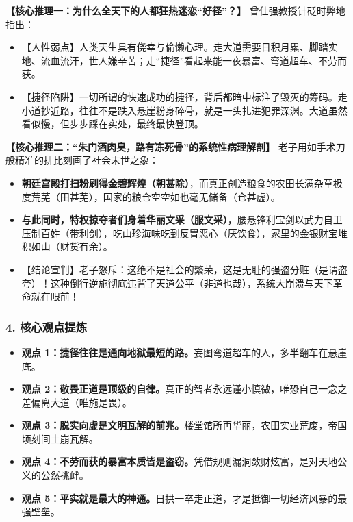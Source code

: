 \noindent\textbf{【核心推理一：为什么全天下的人都狂热迷恋“好径”？】}
曾仕强教授针砭时弊地指出：
\begin{itemize}
    \item 【人性弱点】人类天生具有侥幸与偷懒心理。走大道需要日积月累、脚踏实地、流血流汗，世人嫌辛苦；走“捷径”看起来能一夜暴富、弯道超车、不劳而获。
    \item 【捷径陷阱】一切所谓的快速成功的捷径，背后都暗中标注了毁灭的筹码。走小道抄近路，往往不是跌入悬崖粉身碎骨，就是一头扎进犯罪深渊。大道虽然看似慢，但步步踩在实处，最终最快登顶。
\end{itemize}

\noindent\textbf{【核心推理二：“朱门酒肉臭，路有冻死骨”的系统性病理解剖】}
老子用如手术刀般精准的排比刻画了社会末世之象：
\begin{itemize}
    \item \textbf{朝廷宫殿打扫粉刷得金碧辉煌（朝甚除）}，而真正创造粮食的农田长满杂草极度荒芜（田甚芜），国家的粮仓空空如也毫无储备（仓甚虚）。
    \item \textbf{与此同时，特权掠夺者们身着华丽文采（服文采）}，腰悬锋利宝剑以武力自卫压制百姓（带利剑），吃山珍海味吃到反胃恶心（厌饮食），家里的金银财宝堆积如山（财货有余）。
    \item 【结论宣判】老子怒斥：这绝不是社会的繁荣，这是无耻的强盗分赃（是谓盗夸）！这种倒行逆施彻底违背了天道公平（非道也哉），系统大崩溃与天下革命就在眼前！
\end{itemize}

\subsubsection{4. 核心观点提炼}
\begin{itemize}
    \item \textbf{观点 1：捷径往往是通向地狱最短的路。}妄图弯道超车的人，多半翻车在悬崖底。
    \item \textbf{观点 2：敬畏正道是顶级的自律。}真正的智者永远谨小慎微，唯恐自己一念之差偏离大道（唯施是畏）。
    \item \textbf{观点 3：脱实向虚是文明瓦解的前兆。}楼堂馆所再华丽，农田实业荒废，帝国顷刻间土崩瓦解。
    \item \textbf{观点 4：不劳而获的暴富本质皆是盗窃。}凭借规则漏洞敛财炫富，是对天地公义的公然挑衅。
    \item \textbf{观点 5：平实就是最大的神通。}日拱一卒走正道，才是抵御一切经济风暴的最强壁垒。
\end{itemize}

